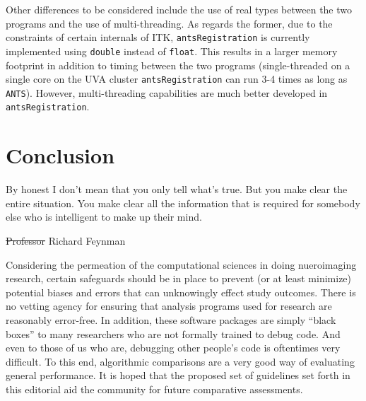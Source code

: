 \documentclass[final,5p,times,twocolumn]{elsarticle}
\newcommand{\trEdit}[1]{{\color{blue}{#1}}}
\newcommand{\trDelete}[1]{{\color{blue}\sout{#1}}}
\begin{document}
Other differences to be considered include the use of real types
\trEdit{(e.g., single vs. double precision, 80-bit x87 vs. 64-bit IEEE~754  computation)} between the
two programs and the use of multi-threading.  As regards the former, due to 
the constraints of certain  internals of ITK,  \verb#antsRegistration#
is currently implemented using \verb#double# instead of \verb#float#.  This
results in a larger memory footprint in addition to timing between the two
programs (single-threaded on a single core on the UVA cluster \verb#antsRegistration#
can run 3-4 times as long as \verb#ANTS#).  However, multi-threading capabilities
are much better developed in \verb#antsRegistration#. 

\trEdit{[Q: would it be worthwile showing the variability of results with
  single- vs. double-preecision ANTS? Also, does result change with number of
  CPUs? That would be interesting to demonstrate also. Finally, using standard
  vs. SSE double precision?]}

\section{Conclusion}

\epigraph{By honest I don't mean that you only tell what's true. But you make clear the 
entire situation. You make clear all the information that is required for somebody else 
who is intelligent to make up their mind.}{\trDelete{Professor }Richard Feynman}
\trEdit{[I think the Feynman quote would be much more appropriately positioned
  at the very beginning of the article, right after the abstract]}

Considering the permeation of the computational sciences in doing 
nueroimaging research, certain safeguards should be in place to prevent
(or at least minimize) potential biases and errors that can
unknowingly effect study outcomes.  There is no vetting agency for
ensuring that analysis programs used for research are reasonably error-free.
In addition, these software packages are simply ``black
boxes'' to many researchers who are not formally trained to debug
code.  And even to those of us who are, debugging other people's code
is oftentimes very difficult.  To this end, algorithmic comparisons are 
a very good way of evaluating general performance.  It is hoped that the
proposed set of guidelines set forth in this editorial aid the community
for future comparative assessments.


\end{document}
